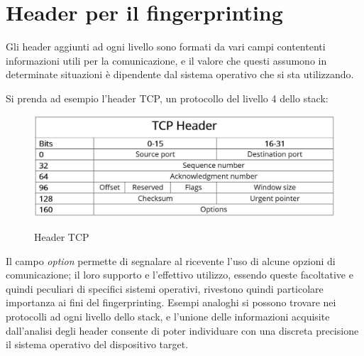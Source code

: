 \section{Header per il fingerprinting}
Gli header aggiunti ad ogni livello sono formati da vari campi contententi informazioni utili per la comunicazione, e il valore che questi assumono in determinate situazioni è dipendente dal sistema operativo che si sta utilizzando.

Si prenda ad esempio l'header TCP, un protocollo del livello 4 dello stack:\\

\begin{figure}[H]
	\centering
	\includegraphics[width=\textwidth]{figures/headerTCP.JPG}
	\caption{Header TCP}
	\label{headerTCP}
	\cite{headerTCP}
\end{figure}

Il campo \textit{option} permette di segnalare al ricevente l'uso di alcune opzioni di comunicazione; il loro supporto e l'effettivo utilizzo, essendo queste facoltative e quindi peculiari di specifici sistemi operativi, rivestono quindi particolare importanza ai fini del fingerprinting.
Esempi analoghi si possono trovare nei protocolli ad ogni livello dello stack, e l'unione delle informazioni acquisite dall'analisi degli header consente di poter individuare con una discreta precisione il sistema operativo del dispositivo target.